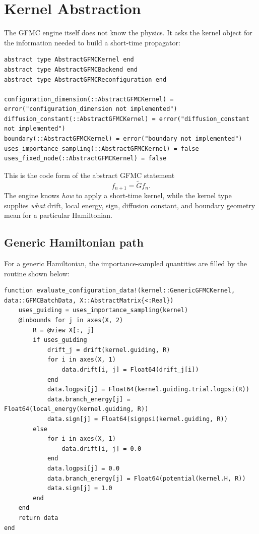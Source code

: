 \documentclass[11pt]{article}
\newcommand{\code}[1]{\texttt{\detokenize{#1}}}
\begin{document}
\section{Kernel Abstraction}

The GFMC engine itself does not know the physics. It asks the kernel object for
the information needed to build a short-time propagator:

\begin{lstlisting}[style=codeblock,caption={Excerpt from \code{src/UseCases/gfmc/abstract.jl}}]
abstract type AbstractGFMCKernel end
abstract type AbstractGFMCBackend end
abstract type AbstractGFMCReconfiguration end

configuration_dimension(::AbstractGFMCKernel) = error("configuration_dimension not implemented")
diffusion_constant(::AbstractGFMCKernel) = error("diffusion_constant not implemented")
boundary(::AbstractGFMCKernel) = error("boundary not implemented")
uses_importance_sampling(::AbstractGFMCKernel) = false
uses_fixed_node(::AbstractGFMCKernel) = false
\end{lstlisting}

This is the code form of the abstract GFMC statement
\begin{equation}
f_{n+1} = \widetilde G f_n.
\end{equation}
The engine knows \emph{how} to apply a short-time kernel, while the kernel type
supplies \emph{what} drift, local energy, sign, diffusion constant, and
boundary geometry mean for a particular Hamiltonian.

\subsection{Generic Hamiltonian path}

For a generic Hamiltonian, the importance-sampled quantities are filled by the
routine shown below:

\begin{lstlisting}[style=codeblock,caption={Generic kernel evaluation in \code{src/UseCases/gfmc/kernels.jl}}]
function evaluate_configuration_data!(kernel::GenericGFMCKernel, data::GFMCBatchData, X::AbstractMatrix{<:Real})
    uses_guiding = uses_importance_sampling(kernel)
    @inbounds for j in axes(X, 2)
        R = @view X[:, j]
        if uses_guiding
            drift_j = drift(kernel.guiding, R)
            for i in axes(X, 1)
                data.drift[i, j] = Float64(drift_j[i])
            end
            data.logpsi[j] = Float64(kernel.guiding.trial.logpsi(R))
            data.branch_energy[j] = Float64(local_energy(kernel.guiding, R))
            data.sign[j] = Float64(signpsi(kernel.guiding, R))
        else
            for i in axes(X, 1)
                data.drift[i, j] = 0.0
            end
            data.logpsi[j] = 0.0
            data.branch_energy[j] = Float64(potential(kernel.H, R))
            data.sign[j] = 1.0
        end
    end
    return data
end
\end{lstlisting}
\end{document}
